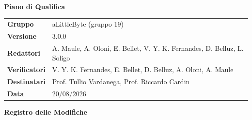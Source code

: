 \documentclass[a4paper,12pt]{article}
\begin{document}
\hypersetup{pageanchor=false}

\thispagestyle{firstpage}

\vspace*{0.5cm}

\begin{center}
    {\LARGE \textbf{Piano di Qualifica}}
\end{center}

\vspace{1.5cm}

\begin{center}
    \renewcommand{\arraystretch}{1.3}
    \begin{tcolorbox}[
        width=0.92\textwidth,
        colback=gray!6,
        colframe=gray!45,
        boxrule=0.5pt,
        arc=2mm,
        boxsep=0pt,
        left=8pt, right=8pt, top=8pt, bottom=8pt
    ]
        \begin{tabularx}{\linewidth}{>{\bfseries}p{3.5cm} X}
            Gruppo      & aLittleByte (gruppo 19) \\
            Versione    & 3.0.0 \\
            Redattori   & A. Maule, A. Oloni, E. Bellet, V. Y. K. Fernandes, D. Belluz, L. Soligo \\
            Verificatori& V. Y. K. Fernandes, E. Bellet, D. Belluz, A. Oloni, A. Maule \\
            Destinatari & Prof. Tullio Vardanega, Prof. Riccardo Cardin \\
            Data        & 20/08/2026 \\
        \end{tabularx}
    \end{tcolorbox}
\end{center}

\newpage


\begin{center}
    {\Large \textbf{Registro delle Modifiche}}
\end{center}

\vspace{0.35cm}
\end{document}
